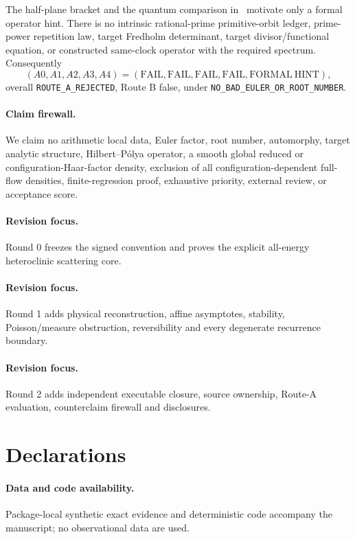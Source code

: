 \documentclass[9pt]{extarticle}
\begin{document}
The half-plane bracket and the quantum comparison in~\cite{BR08} motivate only
a formal operator hint.  There is no intrinsic rational-prime primitive-orbit
ledger, prime-power repetition law, target Fredholm determinant, target
divisor/functional equation, or constructed same-clock operator with the
required spectrum.  Consequently
\[
 (A0,A1,A2,A3,A4)=(\mathrm{FAIL},\mathrm{FAIL},\mathrm{FAIL},
 \mathrm{FAIL},\mathrm{FORMAL\ HINT}),
\]
overall \texttt{ROUTE\_A\_REJECTED}, Route B false, under
\texttt{NO\_BAD\_EULER\_OR\_ROOT\_NUMBER}.

\paragraph{Claim firewall.}
We claim no arithmetic local data, Euler factor, root number, automorphy,
target analytic structure, Hilbert--P\'olya operator, a smooth global reduced
or configuration-Haar-factor density, exclusion of all configuration-dependent full-flow densities,
finite-regression proof, exhaustive priority, external review, or acceptance
score.
\fi

\ifcase\CRevisionRound
\paragraph{Revision focus.} Round 0 freezes the signed convention and proves
the explicit all-energy heteroclinic scattering core.
\or
\paragraph{Revision focus.} Round 1 adds physical reconstruction, affine
asymptotes, stability, Poisson/measure obstruction, reversibility and every
degenerate recurrence boundary.
\or
\paragraph{Revision focus.} Round 2 adds independent executable closure,
source ownership, Route-A evaluation, counterclaim firewall and disclosures.
\fi

\section*{Declarations}
\paragraph{Data and code availability.} Package-local synthetic exact evidence
and deterministic code accompany the manuscript; no observational data are
used.
\end{document}
